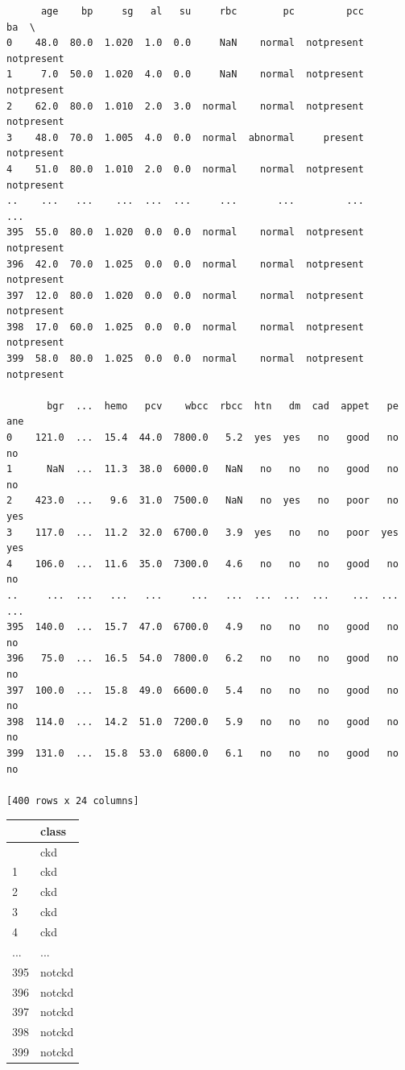 \documentclass[
  11pt,
  letterpaper,
  DIV=11,
  numbers=noendperiod]{scrartcl}
\begin{document}
\begin{verbatim}
      age    bp     sg   al   su     rbc        pc         pcc          ba  \
0    48.0  80.0  1.020  1.0  0.0     NaN    normal  notpresent  notpresent   
1     7.0  50.0  1.020  4.0  0.0     NaN    normal  notpresent  notpresent   
2    62.0  80.0  1.010  2.0  3.0  normal    normal  notpresent  notpresent   
3    48.0  70.0  1.005  4.0  0.0  normal  abnormal     present  notpresent   
4    51.0  80.0  1.010  2.0  0.0  normal    normal  notpresent  notpresent   
..    ...   ...    ...  ...  ...     ...       ...         ...         ...   
395  55.0  80.0  1.020  0.0  0.0  normal    normal  notpresent  notpresent   
396  42.0  70.0  1.025  0.0  0.0  normal    normal  notpresent  notpresent   
397  12.0  80.0  1.020  0.0  0.0  normal    normal  notpresent  notpresent   
398  17.0  60.0  1.025  0.0  0.0  normal    normal  notpresent  notpresent   
399  58.0  80.0  1.025  0.0  0.0  normal    normal  notpresent  notpresent   

       bgr  ...  hemo   pcv    wbcc  rbcc  htn   dm  cad  appet   pe  ane  
0    121.0  ...  15.4  44.0  7800.0   5.2  yes  yes   no   good   no   no  
1      NaN  ...  11.3  38.0  6000.0   NaN   no   no   no   good   no   no  
2    423.0  ...   9.6  31.0  7500.0   NaN   no  yes   no   poor   no  yes  
3    117.0  ...  11.2  32.0  6700.0   3.9  yes   no   no   poor  yes  yes  
4    106.0  ...  11.6  35.0  7300.0   4.6   no   no   no   good   no   no  
..     ...  ...   ...   ...     ...   ...  ...  ...  ...    ...  ...  ...  
395  140.0  ...  15.7  47.0  6700.0   4.9   no   no   no   good   no   no  
396   75.0  ...  16.5  54.0  7800.0   6.2   no   no   no   good   no   no  
397  100.0  ...  15.8  49.0  6600.0   5.4   no   no   no   good   no   no  
398  114.0  ...  14.2  51.0  7200.0   5.9   no   no   no   good   no   no  
399  131.0  ...  15.8  53.0  6800.0   6.1   no   no   no   good   no   no  

[400 rows x 24 columns]
\end{verbatim}

\begin{longtable}[]{@{}ll@{}}
\toprule\noalign{}
& class \\
\midrule\noalign{}
\endhead
\bottomrule\noalign{}
\endlastfoot
0 & ckd \\
1 & ckd \\
2 & ckd \\
3 & ckd \\
4 & ckd \\
... & ... \\
395 & notckd \\
396 & notckd \\
397 & notckd \\
398 & notckd \\
399 & notckd \\
\end{longtable}
\end{document}
